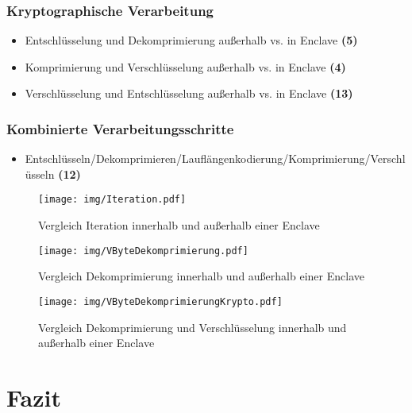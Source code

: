 \subsubsection{Kryptographische Verarbeitung}
\begin{itemize}
	\item Entschlüsselung und Dekomprimierung außerhalb vs. in Enclave \textbf{(5)}
	\item Komprimierung und Verschlüsselung außerhalb vs. in Enclave \textbf{(4)}
	\item Verschlüsselung und Entschlüsselung außerhalb vs. in Enclave \textbf{(13)}
\end{itemize}
\subsubsection{Kombinierte Verarbeitungsschritte}
\begin{itemize}
	\item Entschlüsseln/Dekomprimieren/Lauflängenkodierung/Komprimierung/Verschlüsseln \textbf{(12)}
\end{itemize}

\begin{figure}[h]
	\texttt{[image: img/Iteration.pdf]}
	\centering
	\caption{Vergleich Iteration innerhalb und außerhalb einer Enclave}
	\label{fig:iteration}
\end{figure}

\begin{figure}[h]
	\texttt{[image: img/VByteDekomprimierung.pdf]}
	\centering
	\caption{Vergleich Dekomprimierung innerhalb und außerhalb einer Enclave}
	\label{fig:decompress}
\end{figure}

\begin{figure}[h]
	\texttt{[image: img/VByteDekomprimierungKrypto.pdf]}
	\centering
	\caption{Vergleich Dekomprimierung und Verschlüsselung innerhalb und außerhalb einer Enclave}
	\label{fig:decompresscrypto}
\end{figure}


\section{Fazit}
